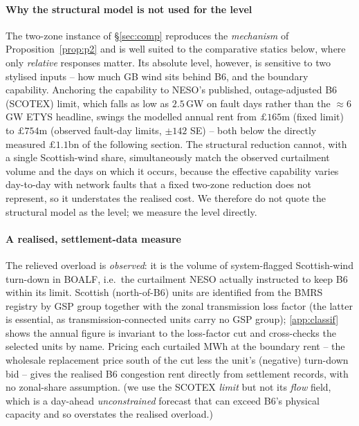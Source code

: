 \documentclass[review,3p,times]{elsarticle}
\theoremstyle{plain}
\theoremstyle{definition}
\begin{document}
\paragraph{Why the structural model is not used for the level} The two-zone
instance of \S\ref{sec:comp} reproduces the \emph{mechanism} of
Proposition~\ref{prop:p2} and is well suited to the comparative statics below,
where only \emph{relative} responses matter. Its absolute level, however, is
sensitive to two stylised inputs -- how much GB wind sits behind B6, and the
boundary capability. Anchoring the capability to NESO's published, outage-adjusted
B6 (SCOTEX) limit, which falls as low as $2.5$\,GW on fault days rather than the
$\approx6$\,GW ETYS headline, swings the modelled annual rent from $\pounds165$m
(fixed limit) to $\pounds754$m (observed fault-day limits, $\pm142$ SE) -- both
below the directly measured $\pounds1.1$bn of the following section. The structural
reduction cannot, with a single Scottish-wind share, simultaneously match the
observed curtailment volume and the days on which it occurs, because the effective
capability varies day-to-day with network faults that a fixed two-zone reduction
does not represent, so it understates the realised cost. We therefore do not quote
the structural model as the level; we measure the level directly.

\paragraph{A realised, settlement-data measure} The relieved overload is
\emph{observed}: it is the volume of system-flagged Scottish-wind turn-down in
BOALF, i.e.\ the curtailment NESO actually instructed to keep B6 within its limit.
Scottish (north-of-B6) units are identified from the BMRS registry by GSP group
together with the zonal transmission loss factor (the latter is essential, as
transmission-connected units carry no GSP group); \ref{app:classif} shows the
annual figure is invariant to the loss-factor cut and cross-checks the selected
units by name.
Pricing each curtailed MWh at the boundary rent -- the wholesale replacement price
south of the cut less the unit's (negative) turn-down bid -- gives the realised B6
congestion rent directly from settlement records, with no zonal-share assumption.
(we use the SCOTEX \emph{limit} but not its \emph{flow} field, which is a
day-ahead \emph{unconstrained} forecast that can exceed B6's physical capacity and
so overstates the realised overload.)
\end{document}
